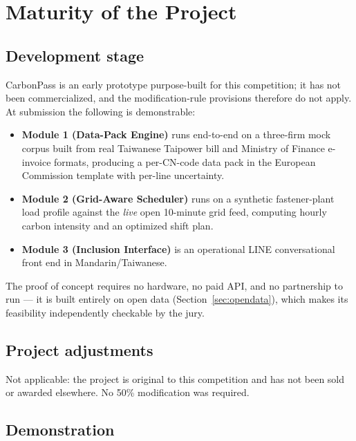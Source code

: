 \section{Maturity of the Project}\label{sec:maturity}

\subsection{Development stage}\label{sec:stage}

CarbonPass is an early prototype purpose-built for this competition; it has not
been commercialized, and the modification-rule provisions therefore do not
apply. At submission the following is demonstrable:

\begin{itemize}[leftmargin=1.3em,itemsep=2pt]
\item \textbf{Module 1 (Data-Pack Engine)} runs end-to-end on a three-firm mock
corpus built from real Taiwanese Taipower bill and Ministry of Finance
e-invoice formats, producing a per-CN-code data pack in the European Commission
template with per-line uncertainty.
\item \textbf{Module 2 (Grid-Aware Scheduler)} runs on a synthetic
fastener-plant load profile against the \emph{live} open 10-minute grid feed,
computing hourly carbon intensity and an optimized shift plan\cite{taipowerdata}.
\item \textbf{Module 3 (Inclusion Interface)} is an operational LINE
conversational front end in Mandarin/Taiwanese.
\end{itemize}

The proof of concept requires no hardware, no paid API, and no partnership to
run --- it is built entirely on open data (Section~\ref{sec:opendata}), which
makes its feasibility independently checkable by the jury.

\subsection{Project adjustments}\label{sec:adjustments}

Not applicable: the project is original to this competition and has not been
sold or awarded elsewhere. No 50\% modification was required.

\subsection{Demonstration}\label{sec:demo}

